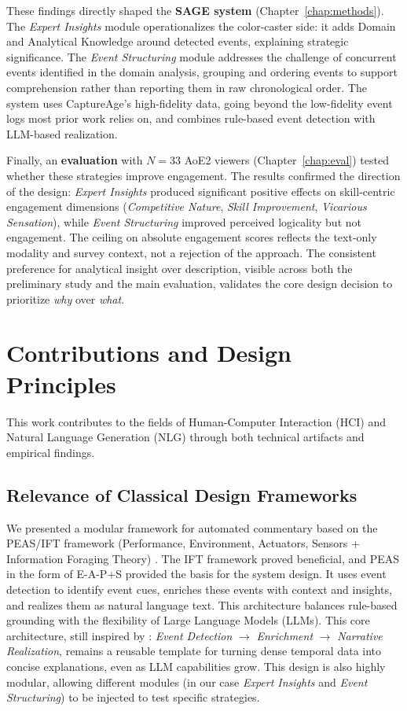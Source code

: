 These findings directly shaped the \textbf{SAGE system} (Chapter~\ref{chap:methods}). The \textit{Expert Insights} module operationalizes the color-caster side: it adds Domain and Analytical Knowledge around detected events, explaining strategic significance. The \textit{Event Structuring} module addresses the challenge of concurrent events identified in the domain analysis, grouping and ordering events to support comprehension rather than reporting them in raw chronological order. The system uses CaptureAge's high-fidelity data, going beyond the low-fidelity event logs most prior work relies on, and combines rule-based event detection with LLM-based realization.

Finally, an \textbf{evaluation} with $N=33$ AoE2 viewers (Chapter~\ref{chap:eval}) tested whether these strategies improve engagement. The results confirmed the direction of the design: \textit{Expert Insights} produced significant positive effects on skill-centric engagement dimensions (\textit{Competitive Nature}, \textit{Skill Improvement}, \textit{Vicarious Sensation}), while \textit{Event Structuring} improved perceived logicality but not engagement. The ceiling on absolute engagement scores reflects the text-only modality and survey context, not a rejection of the approach. The consistent preference for analytical insight over description, visible across both the preliminary study and the main evaluation, validates the core design decision to prioritize \textit{why} over \textit{what}.

\section{Contributions and Design Principles}

This work contributes to the fields of Human-Computer Interaction (HCI) and Natural Language Generation (NLG) through both technical artifacts and empirical findings.

\subsection{Relevance of Classical Design Frameworks}
We presented a modular framework for automated commentary based on the PEAS/IFT\cite{russell1995, pirolli1999} framework (Performance, Environment, Actuators, Sensors + Information Foraging Theory) \cite{dodge2018}. The IFT framework proved beneficial, and PEAS in the form of E-A-P+S provided the basis for the system design. It uses event detection to identify event cues, enriches these events with context and insights, and realizes them as natural language text. This architecture balances rule-based grounding with the flexibility of Large Language Models (LLMs). This core architecture, still inspired by \citet{reiter2000}: \textit{Event Detection} $\rightarrow$ \textit{Enrichment} $\rightarrow$ \textit{Narrative Realization}, remains a reusable template for turning dense temporal data into concise explanations, even as LLM capabilities grow. This design is also highly modular, allowing different modules (in our case \textit{Expert Insights} and \textit{Event Structuring}) to be injected to test specific strategies.

